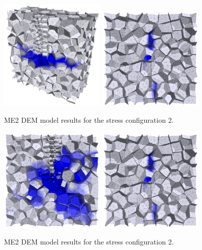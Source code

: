 \begin{figure}[!ht]
\centering
\includegraphics[width=0.45\textwidth]{figures/ME2_DEM_stress1_vertical.pdf}
\includegraphics[width=0.45\textwidth]{figures/ME2_DEM_stress2_side.pdf}
\caption{ME2 DEM model results for the stress configuration 2.}
\label{fig:ME2_DEM_stress1_result}
\end{figure}

\begin{figure}[!ht]
\centering
\includegraphics[width=0.45\textwidth]{figures/ME2_DEM_stress2_vertical.pdf}
\includegraphics[width=0.45\textwidth]{figures/ME2_DEM_stress2_side.pdf}
\caption{ME2 DEM model results for the stress configuration 2.}
\label{fig:ME2_DEM_stress2_result}
\end{figure}

